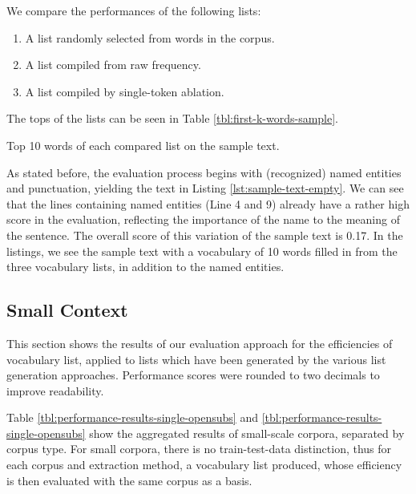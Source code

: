 We compare the performances of the following lists:
\begin{enumerate}
	\item A list randomly selected from words in the corpus.
	\item A list compiled from raw frequency.
	\item A list compiled by single-token ablation.
\end{enumerate}

The tops of the lists can be seen in Table \ref{tbl:first-k-words-sample}.

\begin{table}[H]
	\centering
	
	\caption{Top 10 words of each compared list on the sample text.}
	\label{tbl:first-k-words-sample}
\end{table}






As stated before, the evaluation process begins with (recognized) named entities and punctuation, yielding the text in Listing \ref{lst:sample-text-empty}.
We can see that the lines containing named entities (Line 4 and 9) already have a rather high score in the evaluation, reflecting the importance of the name to the meaning of the sentence.
The overall score of this variation of the sample text is 0.17.
In the listings, we see the sample text with a vocabulary of 10 words filled in from the three vocabulary lists, in addition to the named entities. 




\subsection{Small Context} \label{sec:results-small-context}

This section shows the results of our evaluation approach for the efficiencies of vocabulary list, applied to lists which have been generated by the various list generation approaches.
Performance scores were rounded to two decimals to improve readability.


Table \ref{tbl:performance-results-single-opensubs} and \ref{tbl:performance-results-single-opensubs} show the aggregated results of small-scale corpora, separated by corpus type.
For small corpora, there is no train-test-data distinction, thus for each corpus and extraction method, a vocabulary list produced, whose efficiency is then evaluated with the same corpus as a basis.
%
% 	

